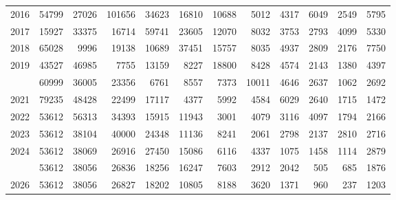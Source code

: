 \documentclass[
]{article}
\begin{document}
\begin{longtable}[t]{lrrrrrrrrrrr}
2016 & 54799 & 27026 & 101656 & 34623 & 16810 & 10688 & 5012 & 4317 & 6049 & 2549 & 5795\\
2017 & 15927 & 33375 & 16714 & 59741 & 23605 & 12070 & 8032 & 3753 & 2793 & 4099 & 5330\\
2018 & 65028 & 9996 & 19138 & 10689 & 37451 & 15757 & 8035 & 4937 & 2809 & 2176 & 7750\\
2019 & 43527 & 46985 & 7755 & 13159 & 8227 & 18800 & 8428 & 4574 & 2143 & 1380 & 4397\\
\addlinespace
2020 & 60999 & 36005 & 23356 & 6761 & 8557 & 7373 & 10011 & 4646 & 2637 & 1062 & 2692\\
2021 & 79235 & 48428 & 22499 & 17117 & 4377 & 5992 & 4584 & 6029 & 2640 & 1715 & 1472\\
2022 & 53612 & 56313 & 34393 & 15915 & 11943 & 3001 & 4079 & 3116 & 4097 & 1794 & 2166\\
2023 & 53612 & 38104 & 40000 & 24348 & 11136 & 8241 & 2061 & 2798 & 2137 & 2810 & 2716\\
2024 & 53612 & 38069 & 26916 & 27450 & 15086 & 6116 & 4337 & 1075 & 1458 & 1114 & 2879\\
\addlinespace
2025 & 53612 & 38056 & 26836 & 18256 & 16247 & 7603 & 2912 & 2042 & 505 & 685 & 1876\\
2026 & 53612 & 38056 & 26827 & 18202 & 10805 & 8188 & 3620 & 1371 & 960 & 237 & 1203\\*
\end{longtable}
\end{document}
